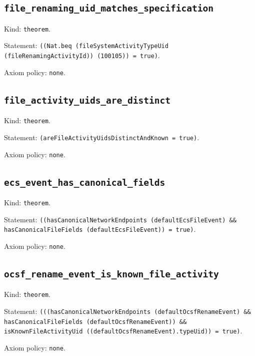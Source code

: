 \documentclass[11pt]{article}
\begin{document}
\subsection*{\texttt{file\_renaming\_uid\_matches\_specification}}
\noindent Kind: \texttt{theorem}.\par
\noindent Statement: \texttt{((Nat.beq (fileSystemActivityTypeUid (fileRenamingActivityId)) (100105)) = true)}.\par
\noindent Axiom policy: \texttt{none}.\par
\subsection*{\texttt{file\_activity\_uids\_are\_distinct}}
\noindent Kind: \texttt{theorem}.\par
\noindent Statement: \texttt{(areFileActivityUidsDistinctAndKnown = true)}.\par
\noindent Axiom policy: \texttt{none}.\par
\subsection*{\texttt{ecs\_event\_has\_canonical\_fields}}
\noindent Kind: \texttt{theorem}.\par
\noindent Statement: \texttt{((hasCanonicalNetworkEndpoints (defaultEcsFileEvent) \&\& hasCanonicalFileFields (defaultEcsFileEvent)) = true)}.\par
\noindent Axiom policy: \texttt{none}.\par
\subsection*{\texttt{ocsf\_rename\_event\_is\_known\_file\_activity}}
\noindent Kind: \texttt{theorem}.\par
\noindent Statement: \texttt{(((hasCanonicalNetworkEndpoints (defaultOcsfRenameEvent) \&\& hasCanonicalFileFields (defaultOcsfRenameEvent)) \&\& isKnownFileActivityUid ((defaultOcsfRenameEvent).typeUid)) = true)}.\par
\noindent Axiom policy: \texttt{none}.\par
\end{document}
